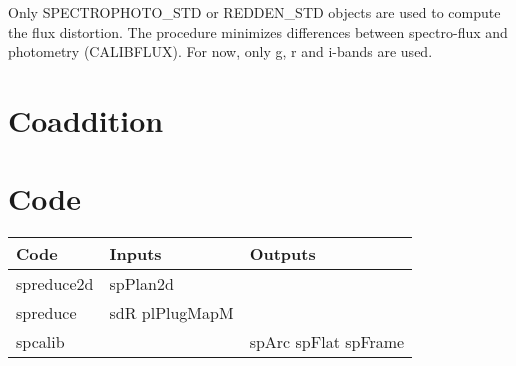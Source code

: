 \documentclass[12pt]{article}
\begin{document}
Only \textsc{SPECTROPHOTO\_STD} or \textsc{REDDEN\_STD} objects are used to compute the flux distortion. The procedure minimizes differences between spectro-flux and photometry (CALIBFLUX). For now, only g, r and i-bands are used.

\section{Coaddition}

\section{Code}

\begin{tabular}{lp{30mm}p{30mm}}
Code & Inputs & Outputs \\
\hline
spreduce2d  & spPlan2d  & \\
\hline
  spreduce    & sdR \newline plPlugMapM & \\
\hline
    spcalib     &       & spArc \newline spFlat \newline spFrame \\
\end{tabular}
\end{document}
